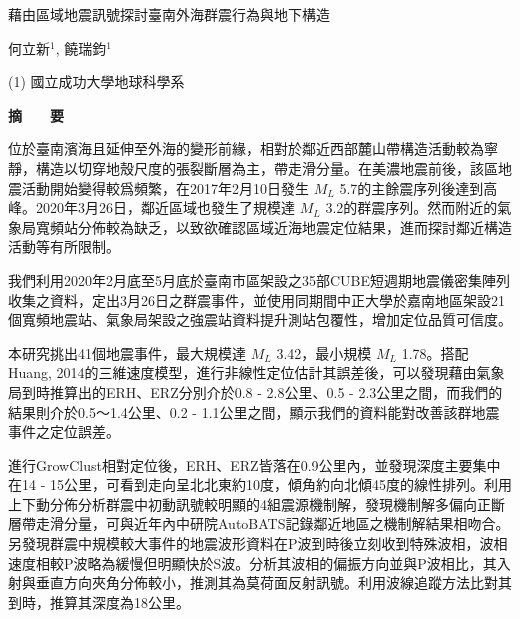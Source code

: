 \documentclass[a4paper]{article}
\begin{document}

\Large
 \begin{center}
藉由區域地震訊號探討臺南外海群震行為與地下構造\\ 

\hspace{10pt}

\large
何立新$^1$, 饒瑞鈞$^1$ \\

\hspace{10pt}

\small  
(1) 國立成功大學地球科學系\\

\hspace{10pt}


\large
\textbf{摘　　要}
\end{center}

\normalsize
位於臺南濱海且延伸至外海的變形前緣，相對於鄰近西部麓山帶構造活動較為寧靜，構造以切穿地殼尺度的張裂斷層為主，帶走滑分量。在美濃地震前後，該區地震活動開始變得較爲頻繁，在2017年2月10日發生 $M_{L}$ 5.7的主餘震序列後達到高峰。2020年3月26日，鄰近區域也發生了規模達 $M_{L}$  3.2的群震序列。然而附近的氣象局寬頻站分佈較為缺乏，以致欲確認區域近海地震定位結果，進而探討鄰近構造活動等有所限制。

我們利用2020年2月底至5月底於臺南市區架設之35部CUBE短週期地震儀密集陣列收集之資料，定出3月26日之群震事件，並使用同期間中正大學於嘉南地區架設21個寬頻地震站、氣象局架設之強震站資料提升測站包覆性，增加定位品質可信度。

本研究挑出41個地震事件，最大規模達 $M_{L}$ 3.42，最小規模 $M_{L}$ 1.78。搭配Huang, 2014的三維速度模型，進行非線性定位估計其誤差後，可以發現藉由氣象局到時推算出的ERH、ERZ分別介於0.8 - 2.8公里、0.5 - 2.3公里之間，而我們的結果則介於0.5～1.4公里、0.2 - 1.1公里之間，顯示我們的資料能對改善該群地震事件之定位誤差。

進行GrowClust相對定位後，ERH、ERZ皆落在0.9公里內，並發現深度主要集中在14 - 15公里，可看到走向呈北北東約10度，傾角約向北傾45度的線性排列。利用上下動分佈分析群震中初動訊號較明顯的4組震源機制解，發現機制解多偏向正斷層帶走滑分量，可與近年內中研院AutoBATS記錄鄰近地區之機制解結果相吻合。另發現群震中規模較大事件的地震波形資料在P波到時後立刻收到特殊波相，波相速度相較P波略為緩慢但明顯快於S波。分析其波相的偏振方向並與P波相比，其入射與垂直方向夾角分佈較小，推測其為莫荷面反射訊號。利用波線追蹤方法比對其到時，推算其深度為18公里。
\end{document}
